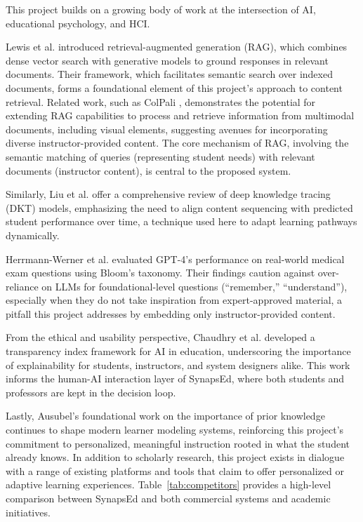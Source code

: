 \documentclass{stylefiles/capstone}
\begin{document}
This project builds on a growing body of work at the intersection of AI, educational psychology, and HCI.

Lewis et al. \cite{lewis2021rag} introduced retrieval-augmented generation (RAG), which combines dense vector search with generative models to ground responses in relevant documents. Their framework, which facilitates semantic search over indexed documents, forms a foundational element of this project's approach to content retrieval. Related work, such as ColPali \cite{faysse2025colpaliefficientdocumentretrieval}, demonstrates the potential for extending RAG capabilities to process and retrieve information from multimodal documents, including visual elements, suggesting avenues for incorporating diverse instructor-provided content. The core mechanism of RAG, involving the semantic matching of queries (representing student needs) with relevant documents (instructor content), is central to the proposed system.

Similarly, Liu et al. \cite{liu2025deepkt} offer a comprehensive review of deep knowledge tracing (DKT) models, emphasizing the need to align content sequencing with predicted student performance over time, a technique used here to adapt learning pathways dynamically.

Herrmann-Werner et al. \cite{herrmann2024gpt} evaluated GPT-4’s performance on real-world medical exam questions using Bloom’s taxonomy. Their findings caution against over-reliance on LLMs for foundational-level questions (“remember,” “understand”), especially when they do not take inspiration from expert-approved material,  a pitfall this project addresses by embedding only instructor-provided content.

From the ethical and usability perspective, Chaudhry et al. \cite{chaudhry2022transparency} developed a transparency index framework for AI in education, underscoring the importance of explainability for students, instructors, and system designers alike. This work informs the human-AI interaction layer of SynapsEd, where both students and professors are kept in the decision loop.

Lastly, Ausubel’s foundational work \cite{ausubel1968educational} on the importance of prior knowledge continues to shape modern learner modeling systems, reinforcing this project’s commitment to personalized, meaningful instruction rooted in what the student already knows.
In addition to scholarly research, this project exists in dialogue with a range of existing platforms and tools that claim to offer personalized or adaptive learning experiences. Table~\ref{tab:competitors} provides a high-level comparison between SynapsEd and both commercial systems and academic initiatives.
\end{document}
